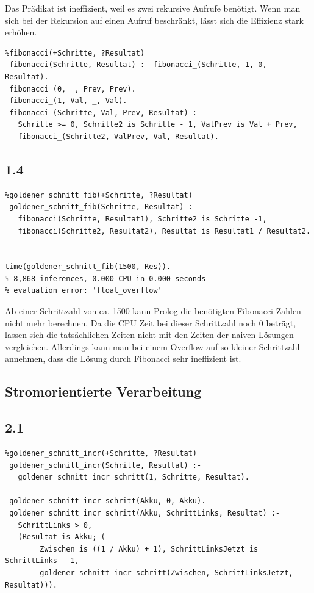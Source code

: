 \documentclass[a4paper, 11pt]{article}
\begin{document}
Das Pr\"adikat ist ineffizient, weil es zwei rekursive Aufrufe ben\"otigt. Wenn man sich bei der Rekursion auf einen Aufruf beschr\"ankt, l\"asst sich die Effizienz stark erh\"ohen.

\begin{verbatim}
%fibonacci(+Schritte, ?Resultat)
 fibonacci(Schritte, Resultat) :- fibonacci_(Schritte, 1, 0, Resultat).
 fibonacci_(0, _, Prev, Prev).
 fibonacci_(1, Val, _, Val).
 fibonacci_(Schritte, Val, Prev, Resultat) :- 
   Schritte >= 0, Schritte2 is Schritte - 1, ValPrev is Val + Prev, 
   fibonacci_(Schritte2, ValPrev, Val, Resultat).
\end{verbatim}

\subsection*{1.4}

\begin{verbatim}
%goldener_schnitt_fib(+Schritte, ?Resultat)
 goldener_schnitt_fib(Schritte, Resultat) :-
   fibonacci(Schritte, Resultat1), Schritte2 is Schritte -1,
   fibonacci(Schritte2, Resultat2), Resultat is Resultat1 / Resultat2.


time(goldener_schnitt_fib(1500, Res)).
% 8,868 inferences, 0.000 CPU in 0.000 seconds
% evaluation error: 'float_overflow'
\end{verbatim}

Ab einer Schrittzahl von ca. 1500 kann Prolog die ben\"otigten Fibonacci Zahlen nicht mehr berechnen. Da die CPU Zeit bei dieser Schrittzahl noch 0 betr\"agt, lassen sich die tats\"achlichen Zeiten nicht mit den Zeiten der naiven L\"osungen vergleichen. Allerdings kann man bei einem Overflow auf so kleiner Schrittzahl annehmen, dass die L\"osung durch Fibonacci sehr ineffizient ist. 

\subsection{Stromorientierte Verarbeitung}

\subsection*{2.1}

\begin{verbatim}
%goldener_schnitt_incr(+Schritte, ?Resultat)
 goldener_schnitt_incr(Schritte, Resultat) :-
   goldener_schnitt_incr_schritt(1, Schritte, Resultat).
    
 goldener_schnitt_incr_schritt(Akku, 0, Akku).
 goldener_schnitt_incr_schritt(Akku, SchrittLinks, Resultat) :-
   SchrittLinks > 0,
   (Resultat is Akku; (
        Zwischen is ((1 / Akku) + 1), SchrittLinksJetzt is SchrittLinks - 1,
        goldener_schnitt_incr_schritt(Zwischen, SchrittLinksJetzt, Resultat))).
\end{verbatim}
\end{document}
